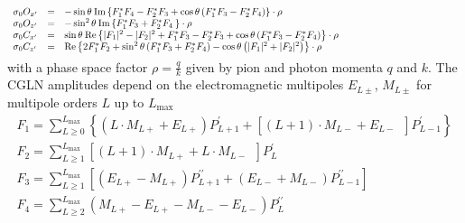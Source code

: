\documentclass[a4paper,10pt]{article}
\def\cc{^*}
\def\Re{\mathrm{Re}}
\def\Im{\mathrm{Im}}
\begin{document}
\begin{displaymath}\label{frm_Obs2}
\begin{array}{lll}
\sigma_0 O_{x^\prime} & = & -\sin\theta \:\Im \left\lbrace F_1\cc F_4 - F_2\cc F_3
                                                      + \cos\theta\left(F_1\cc F_3 - F_2\cc F_4\right)
                                                       \right\rbrace \cdot \rho\\
\sigma_0 O_{z^\prime} & = & -\sin^2\theta \:\Im \left\lbrace F_1\cc F_3 + F_2\cc F_4\:
                                                       \right\rbrace \cdot \rho\\
\sigma_0 C_{x^\prime} & = & \sin\theta \:\Re \left\lbrace |F_1|^2 - |F_2|^2 
                                                      + F_1\cc F_3 - F_2\cc F_3 
                                                      +\cos\theta\left(F_1\cc F_3 - F_2\cc F_4\right)
                                                       \right\rbrace \cdot \rho\\
\sigma_0 C_{z^\prime} & = & \Re \left\lbrace 2 F_1\cc F_2 
                                                      +\sin^2\theta\left(F_1\cc F_3 + F_2\cc F_4\right)
                                                      -\cos\theta\left(|F_1|^2+|F_2|^2\right)
                                                       \right\rbrace \cdot \rho\\

&&\phantom{\Re \left\lbrace |F_1|^2 + |F_2|^2 - 2\cos\theta F_1\cc F_2  + \frac{1}{2}\sin^2\theta\left[ |F_3|^2 + |F_4|^2 + 2 F_2\cc  F_3    + 2 F_1\cc  F4 + 2\cos\theta F_3\cc F_4\right] \right\rbrace \cdot \rho}\vspace{-1.5em}\\
\end{array}
\end{displaymath}
with a phase space factor $\rho = \frac{q}{k}$ given by pion and photon momenta $q$ and $k$. The CGLN amplitudes
depend on the electromagnetic multipoles $E_{L\pm}$, $M_{L\pm}$ for multipole orders $L$ up to $L_\mathrm{max}$
\begin{displaymath}\label{frm_CGLN}
\begin{array}{l}
F_1 = \sum\limits_{L\geq 0}^{L_\mathrm{max}} \left\lbrace (L\cdot M_{L+} + E_{L+})P^{\prime}_{L+1} 
+ \left[(L+1)\cdot M_{L-} + E_{L-}\phantom{{}^{\prime}_{L}}\right]P^{\prime}_{L-1} \right\rbrace\\
F_2 = \sum\limits_{L\geq 1}^{L_\mathrm{max}} \left[(L+1)\cdot M_{L+} + L\cdot M_{L-} \phantom{{}^{\prime}_{L}}  \right]P^{\prime}_{L}\\
F_3 = \sum\limits_{L\geq 1}^{L_\mathrm{max}} \left[(E_{L+} - M_{L+})P^{\prime\prime}_{L+1}+ (E_{L-} + M_{L-})P^{\prime\prime}_{L-1} \right]\\
F_4 = \sum\limits_{L\geq 2}^{L_\mathrm{max}}\left( M_{L+} - E_{L+} - M_{L-} - E_{L-}\right)P^{\prime\prime}_{L}
\end{array}
\end{displaymath}
\end{document}
